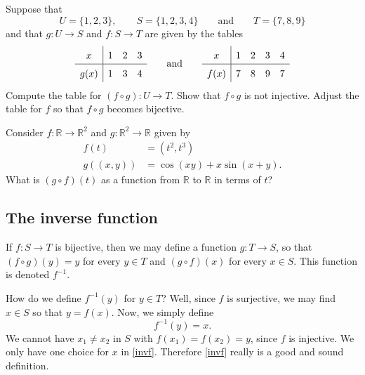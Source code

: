 \begin{exercise}
  Suppose that
  $$
    U = \{1, 2, 3\},\qquad S = \{1, 2, 3, 4\}\qquad\text{and}\qquad T = \{7, 8, 9\}
  $$
  and that $g: U \rightarrow S$ and $f: S\rightarrow T$ are given by the tables
  $$
    \def\arraystretch{1.5}
    \begin{array}{c|ccccccc}
      x    & 1 & 2 & 3 \\ \hline
      g(x) & 1 & 3 & 4
    \end{array}\qquad\text{and}\qquad
    \begin{array}{c|ccccccc}
      x    & 1 & 2 & 3 & 4 \\ \hline
      f(x) & 7 & 8 & 9 & 7
    \end{array}
  $$
  Compute the table for $(f\circ g): U\rightarrow T$. Show that $f\circ g$ is not
  injective. Adjust the table for $f$ so that $f\circ g$ becomes bijective.
\end{exercise}

\begin{exercise}
  Consider $f: \mathbb{R}\rightarrow \mathbb{R}^2$ and $g: \mathbb{R}^2\rightarrow \mathbb{R}$ given by
  \begin{align*}
    f(t)      & = (t^2, t^3)                 \\
    g((x, y)) & = \cos(x y) + x \sin(x + y).
  \end{align*}
  What is $(g\circ f)(t)$ as a function from $\mathbb{R}$ to $\mathbb{R}$ in terms of $t$?
\end{exercise}

\subsection{The inverse function}

If $f:S\rightarrow T$ is bijective, then we may define a function $g: T\rightarrow S$, so
that $(f\circ g)(y) = y$ for every $y\in T$ and $(g\circ f)(x)$ for every $x\in S$. This
function is denoted $f^{-1}$.

How do we define $f^{-1}(y)$ for $y\in T$? Well, since $f$ is surjective, we may find
$x\in S$ so that $y = f(x)$. Now, we simply define
\begin{equation}\label{invf}
  f^{-1}(y) = x.
\end{equation}
We cannot have $x_1 \neq x_2$ in $S$ with $f(x_1) = f(x_2) = y$, since $f$ is injective. We only have one choice for
$x$ in \eqref{invf}. Therefore \eqref{invf} really is a good and sound definition.

